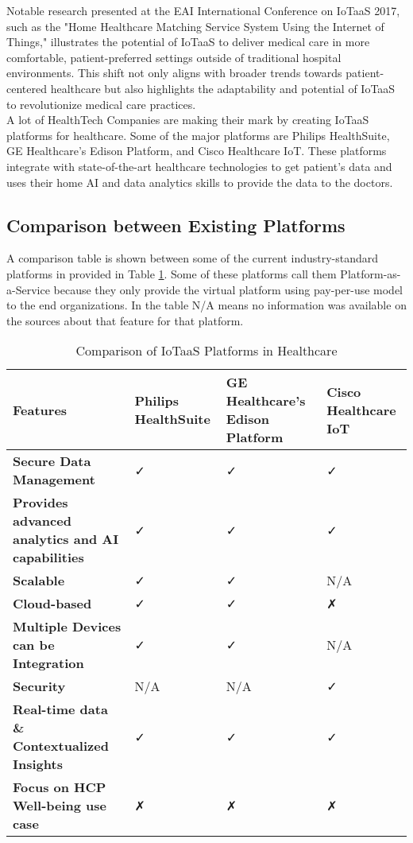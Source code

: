 \noindent Notable research presented at the EAI International Conference on IoTaaS 2017, such as the "Home Healthcare Matching Service System Using the Internet of Things," illustrates the potential of IoTaaS to deliver medical care in more comfortable, patient-preferred settings outside of traditional hospital environments.\cite{44} This shift not only aligns with broader trends towards patient-centered healthcare but also highlights the adaptability and potential of IoTaaS to revolutionize medical care practices. \\

\noindent A lot of HealthTech Companies are making their mark by creating IoTaaS platforms for healthcare. Some of the major platforms are Philips HealthSuite, GE Healthcare's Edison Platform, and Cisco Healthcare IoT. These platforms integrate with state-of-the-art healthcare technologies to get patient's data and uses their home AI and data analytics skills to provide the data to the doctors. \\

\subsection{Comparison between Existing Platforms}

\noindent A comparison table is shown between some of the current industry-standard platforms in provided in Table \ref{tab:iot-comparison}. Some of these platforms call them Platform-as-a-Service because they only provide the virtual platform using pay-per-use model to the end organizations. In the table N/A means no information was available on the sources about that feature for that platform. 


\begin{table}[ht]
\centering
\begin{tabularx}{\textwidth}{|l|X|X|X|}
\hline
\textbf{Features} & \textbf{Philips HealthSuite} & \textbf{GE Healthcare's Edison Platform} & \textbf{Cisco Healthcare IoT} \\ \hline
\textbf{Secure Data Management} &  ✓ &  ✓ &  ✓ \\ \hline
\textbf{Provides advanced analytics and AI capabilities} &  ✓ &  ✓ &  ✓ \\ \hline
\textbf{Scalable} & ✓ & ✓ & N/A \\ \hline
\textbf{Cloud-based} &  ✓ &  ✓ & ✗ \\ \hline
\textbf{Multiple Devices can be Integration} & ✓ & ✓ & N/A \\ \hline
\textbf{Security} & N/A & N/A & ✓ \\ \hline
\textbf{Real-time data \& Contextualized Insights} & ✓ & ✓ & ✓ \\ \hline
\textbf{Focus on HCP Well-being use case} & ✗ & ✗ & ✗ \\ \hline
\end{tabularx}
\caption{Comparison of IoTaaS Platforms in Healthcare}
\label{tab:iot-comparison}
\end{table}


